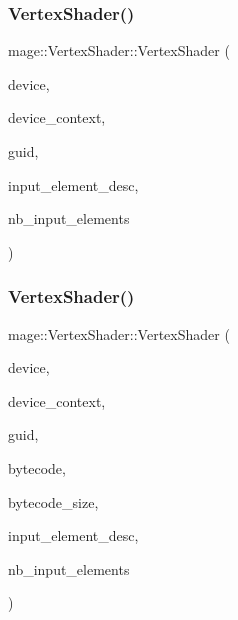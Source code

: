 \subsubsection{\texorpdfstring{Vertex\+Shader()}{VertexShader()}\hspace{0.1cm}{\footnotesize\ttfamily [1/4]}}
{\footnotesize\ttfamily mage\+::\+Vertex\+Shader\+::\+Vertex\+Shader (\begin{DoxyParamCaption}\item[{I\+D3\+D11\+Device2 $\ast$}]{device,  }\item[{I\+D3\+D11\+Device\+Context2 $\ast$}]{device\+\_\+context,  }\item[{const wstring \&}]{guid,  }\item[{const D3\+D11\+\_\+\+I\+N\+P\+U\+T\+\_\+\+E\+L\+E\+M\+E\+N\+T\+\_\+\+D\+E\+SC $\ast$}]{input\+\_\+element\+\_\+desc,  }\item[{uint32\+\_\+t}]{nb\+\_\+input\+\_\+elements }\end{DoxyParamCaption})\hspace{0.3cm}{\ttfamily [explicit]}}

\hypertarget{classmage_1_1_vertex_shader_a6084c9d362a18e9676194acb8b454030}{}\label{classmage_1_1_vertex_shader_a6084c9d362a18e9676194acb8b454030} 
\subsubsection{\texorpdfstring{Vertex\+Shader()}{VertexShader()}\hspace{0.1cm}{\footnotesize\ttfamily [2/4]}}
{\footnotesize\ttfamily mage\+::\+Vertex\+Shader\+::\+Vertex\+Shader (\begin{DoxyParamCaption}\item[{I\+D3\+D11\+Device2 $\ast$}]{device,  }\item[{I\+D3\+D11\+Device\+Context2 $\ast$}]{device\+\_\+context,  }\item[{const wstring \&}]{guid,  }\item[{const void $\ast$}]{bytecode,  }\item[{S\+I\+Z\+E\+\_\+T}]{bytecode\+\_\+size,  }\item[{const D3\+D11\+\_\+\+I\+N\+P\+U\+T\+\_\+\+E\+L\+E\+M\+E\+N\+T\+\_\+\+D\+E\+SC $\ast$}]{input\+\_\+element\+\_\+desc,  }\item[{uint32\+\_\+t}]{nb\+\_\+input\+\_\+elements }\end{DoxyParamCaption})\hspace{0.3cm}{\ttfamily [explicit]}}

